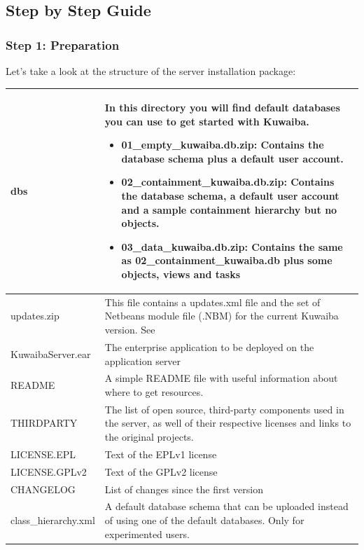 \documentclass[a4paper]{article}
\begin{document}
		
		\newpage
		\subsection{Step by Step Guide}
		\subsubsection{Step 1: Preparation}
			Let's take a look at the structure of the server installation package:
			
			\begin{table}[h!]
				\begin{tabular}{p{5cm}p{10cm}}
					\toprule
					dbs & 
					In this directory you will find default databases you can use to get started with Kuwaiba.
					\begin{itemize}
						\item \textbf{01\_empty\_kuwaiba.db.zip}: Contains the database schema plus a default user account.
						\item \textbf{02\_containment\_kuwaiba.db.zip}: Contains the database schema, a default user account and a sample containment hierarchy but no objects.
						\item \textbf{03\_data\_kuwaiba.db.zip}: Contains the same as 02\_containment\_kuwaiba.db plus some objects, views and tasks 
						
					\end{itemize} \\
					\midrule
					updates.zip & This file contains a updates.xml file and the set of Netbeans module file (.NBM) for the current Kuwaiba version. See \textbf{\nameref{app:AppendixE}}\\
					\midrule
					KuwaibaServer.ear & The enterprise application to be deployed on the application server \\
					\midrule
					README & A simple README file with useful information about where to get resources. \\
					\midrule
					THIRDPARTY & The list of open source, third-party components used in the server, as well of their respective licenses and links to the original projects. \\
					\midrule
					LICENSE.EPL & Text of the EPLv1 license \\
					\midrule
					LICENSE.GPLv2 & Text of the GPLv2 license \\
					\midrule
					CHANGELOG & List of changes since the first version \\
					\midrule
					class\_hierarchy.xml & A default database schema that can be uploaded instead of using one of the default databases. Only for experimented users. \\
					\bottomrule	
				\end{tabular}
			\end{table}
\end{document}

